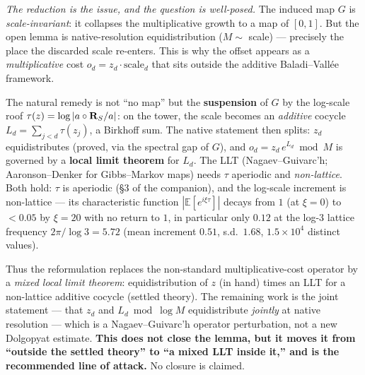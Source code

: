 \documentclass[11pt]{article}
\theoremstyle{remark}\newtheorem{remark}{Remark}
\begin{document}
\emph{The reduction is the issue, and the question is well-posed.} The induced
map $G$ is \emph{scale-invariant}: it collapses the multiplicative growth to a
map of $[0,1]$. But the open lemma is native-resolution equidistribution
($M\sim$ scale) --- precisely the place the discarded scale re-enters. This is
why the offset appears as a \emph{multiplicative} cost $o_d=z_d\cdot\text{scale}_d$
that sits outside the additive Baladi--Vall\'ee framework.

The natural remedy is not ``no map'' but the \textbf{suspension} of $G$ by the
log-scale roof $\tau(z)=\log|a\circ\mathbf{R}_S/a|$: on the tower, the scale becomes an
\emph{additive} cocycle $L_d=\sum_{j<d}\tau(z_j)$, a Birkhoff sum. The native
statement then splits: $z_d$ equidistributes (proved, via the spectral gap of
$G$), and $o_d=z_d\,e^{L_d}\bmod M$ is governed by a \textbf{local limit
theorem} for $L_d$. The LLT (Nagaev--Guivarc'h; Aaronson--Denker for
Gibbs--Markov maps) needs $\tau$ aperiodic and \emph{non-lattice}. Both hold:
$\tau$ is aperiodic (\S3 of the companion), and the log-scale increment is
non-lattice --- its characteristic function $|\mathbb E[e^{i\xi\tau}]|$ decays
from $1$ (at $\xi=0$) to $<0.05$ by $\xi=20$ with no return to $1$, in
particular only $0.12$ at the log-$3$ lattice frequency $2\pi/\log3=5.72$
(mean increment $0.51$, s.d.\ $1.68$, $1.5\times10^4$ distinct values).

Thus the reformulation replaces the non-standard multiplicative-cost operator
by a \emph{mixed local limit theorem}: equidistribution of $z$ (in hand) times
an LLT for a non-lattice additive cocycle (settled theory). The remaining work
is the joint statement --- that $z_d$ and $L_d\bmod\log M$ equidistribute
\emph{jointly} at native resolution --- which is a Nagaev--Guivarc'h operator
perturbation, not a new Dolgopyat estimate. \textbf{This does not close the
lemma, but it moves it from ``outside the settled theory'' to ``a mixed LLT
inside it,'' and is the recommended line of attack.} No closure is claimed.
\end{document}
